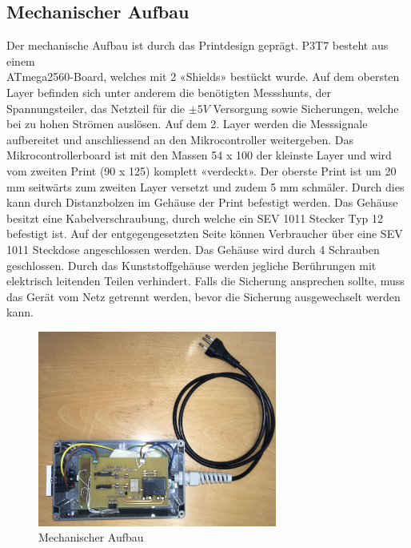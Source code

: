 \subsection{Mechanischer Aufbau}
Der mechanische Aufbau ist durch das Printdesign geprägt. P3T7 besteht aus einem \\ ATmega2560-Board, welches mit 2 «Shields» bestückt wurde. Auf dem obersten Layer befinden sich unter anderem die benötigten Messshunts, der Spannungsteiler, das Netzteil für die $\pm 5V$ Versorgung sowie Sicherungen, welche bei zu hohen Strömen auslösen. Auf dem 2. Layer werden die Messsignale aufbereitet und anschliessend an den Mikrocontroller weitergeben. Das Mikrocontrollerboard ist mit den Massen 54 x 100 der kleinste Layer und wird vom zweiten Print (90 x 125) komplett «verdeckt». Der oberste Print ist um 20 mm seitwärts zum zweiten Layer versetzt und zudem 5 mm schmäler. Durch dies kann durch Distanzbolzen im Gehäuse der Print befestigt werden. Das Gehäuse besitzt eine Kabelverschraubung, durch welche ein SEV 1011 Stecker Typ 12 befestigt ist. Auf der entgegengesetzten Seite können Verbraucher über eine SEV 1011 Steckdose angeschlossen werden.
Das Gehäuse wird durch 4 Schrauben geschlossen. Durch das Kunststoffgehäuse werden jegliche Berührungen mit elektrisch leitenden Teilen verhindert. Falls die Sicherung ansprechen sollte, muss das Gerät vom Netz getrennt werden, bevor die Sicherung ausgewechselt werden kann. 


\begin{figure}[H]
\begin{center}
\includegraphics[width=0.7\textwidth ]{images/Konzept_MechAuf.jpeg}
\caption{Mechanischer Aufbau}
\label{fig:Mechanischer_Aufbau}
\end{center}
\end{figure}

